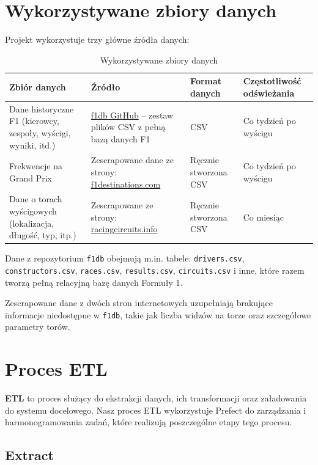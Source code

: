 \documentclass[12pt]{article}
\begin{document}
\section{Wykorzystywane zbiory danych}

Projekt wykorzystuje trzy główne źródła danych:

\begin{table}[ht]
\centering
\begin{tabular}{|p{4cm}|p{5cm}|p{2.5cm}|p{3cm}|}
\hline
\textbf{Zbiór danych} & \textbf{Źródło} & \textbf{Format danych} & \textbf{Częstotliwość odświeżania} \\
\hline
Dane historyczne F1 (kierowcy, zespoły, wyścigi, wyniki, itd.) & \href{https://github.com/f1db/f1db}{f1db GitHub} – zestaw plików CSV z pełną bazą danych F1 & CSV & Co tydzień po wyścigu \\
\hline
Frekwencje na Grand Prix & Zescrapowane dane ze strony: \href{https://f1destinations.com/resources/f1-attendance-figures/}{f1destinations.com} & Ręcznie stworzona CSV & Co tydzień po wyścigu\\
\hline
Dane o torach wyścigowych (lokalizacja, długość, typ, itp.) & Zescrapowane ze strony: \href{https://www.racingcircuits.info}{racingcircuits.info} & Ręcznie stworzona CSV & Co miesiąc\\
\hline
\end{tabular}
\caption{Wykorzystywane zbiory danych}
\end{table}

Dane z repozytorium \texttt{f1db} obejmują m.in. tabele: \texttt{drivers.csv}, \texttt{constructors.csv}, \texttt{races.csv}, \texttt{results.csv}, \texttt{circuits.csv} i inne, które razem tworzą pełną relacyjną bazę danych Formuły 1.

Zescrapowane dane z dwóch stron internetowych uzupełniają brakujące informacje niedostępne w \texttt{f1db}, takie jak liczba widzów na torze oraz szczegółowe parametry torów.

\section{Proces ETL}

\textbf{ETL} to proces służący do ekstrakcji danych, ich transformacji oraz załadowania do systemu docelowego. Nasz proces ETL wykorzystuje Prefect do zarządzania i harmonogramowania zadań, które realizują poszczególne etapy tego procesu.

\subsection{Extract}
\end{document}
